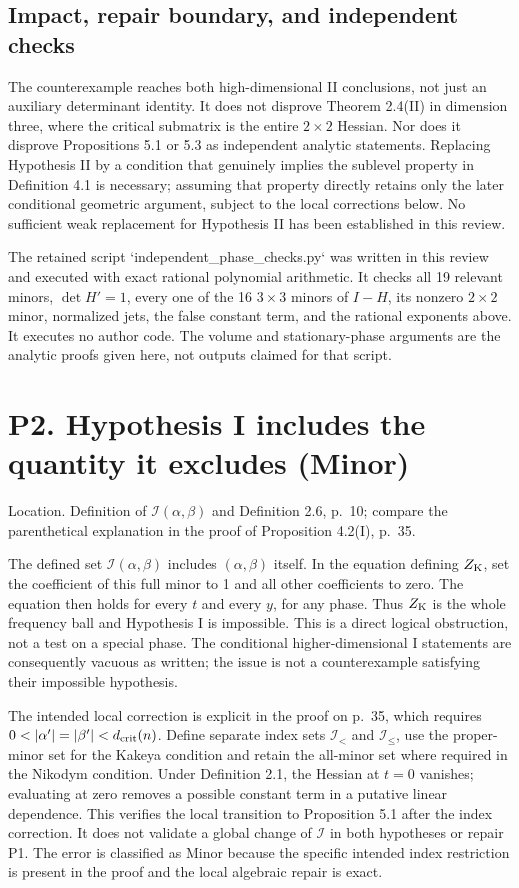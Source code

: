 \documentclass[10pt]{article}
\begin{document}
\subsection*{Impact, repair boundary, and independent checks}
The counterexample reaches both high-dimensional II conclusions, not just an auxiliary determinant identity. It does not disprove Theorem 2.4(II) in dimension three, where the critical submatrix is the entire \(2\times2\) Hessian. Nor does it disprove Propositions 5.1 or 5.3 as independent analytic statements. Replacing Hypothesis II by a condition that genuinely implies the sublevel property in Definition 4.1 is necessary; assuming that property directly retains only the later conditional geometric argument, subject to the local corrections below. No sufficient weak replacement for Hypothesis II has been established in this review.\par
The retained script `independent\_phase\_checks.py` was written in this review and executed with exact rational polynomial arithmetic. It checks all 19 relevant minors, \(\det H'=1\), every one of the 16 \(3\times3\) minors of \(I-H\), its nonzero \(2\times2\) minor, normalized jets, the false constant term, and the rational exponents above. It executes no author code. The volume and stationary-phase arguments are the analytic proofs given here, not outputs claimed for that script.\par
\section*{P2. Hypothesis I includes the quantity it excludes (Minor)}
Location. Definition of \(\mathcal I(\alpha,\beta)\) and Definition 2.6, p. 10; compare the parenthetical explanation in the proof of Proposition 4.2(I), p. 35.\par
The defined set \(\mathcal I(\alpha,\beta)\) includes \((\alpha,\beta)\) itself. In the equation defining \(Z_{\rm K}\), set the coefficient of this full minor to 1 and all other coefficients to zero. The equation then holds for every \(t\) and every \(y\), for any phase. Thus \(Z_{\rm K}\) is the whole frequency ball and Hypothesis I is impossible. This is a direct logical obstruction, not a test on a special phase. The conditional higher-dimensional I statements are consequently vacuous as written; the issue is not a counterexample satisfying their impossible hypothesis.\par
The intended local correction is explicit in the proof on p. 35, which requires \(0<|\alpha'|=|\beta'|<d_{\rm crit}(n)\). Define separate index sets \(\mathcal I_{<}\) and \(\mathcal I_{\leq}\), use the proper-minor set for the Kakeya condition and retain the all-minor set where required in the Nikodym condition. Under Definition 2.1, the Hessian at \(t=0\) vanishes; evaluating at zero removes a possible constant term in a putative linear dependence. This verifies the local transition to Proposition 5.1 after the index correction. It does not validate a global change of \(\mathcal I\) in both hypotheses or repair P1. The error is classified as Minor because the specific intended index restriction is present in the proof and the local algebraic repair is exact.\par
\end{document}
